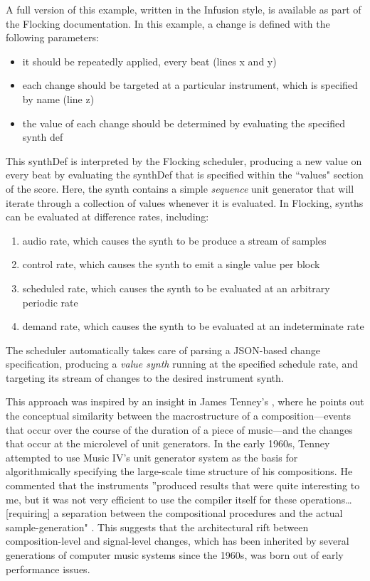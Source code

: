 \documentclass{article}
\begin{document}
A full version of this example, written in the Infusion style, is available as part of the Flocking documentation. In this example, a change is defined with the following parameters:

\begin{itemize}
\item it should be repeatedly applied, every beat (lines x and y)
\item each change should be targeted at a particular instrument, which is specified by name (line z)
\item the value of each change should be determined by evaluating the specified synth def
\end{itemize}

This synthDef is interpreted by the Flocking scheduler, producing a new value on every beat by evaluating the synthDef that is specified within the ``values" section of the score. Here, the synth contains a simple {\it sequence} unit generator that will iterate through a collection of values whenever it is evaluated. In Flocking, synths can be evaluated at difference rates, including:

\begin{enumerate}
\item audio rate, which causes the synth to be produce a stream of samples
\item control rate, which causes the synth to emit a single value per block
\item scheduled rate, which causes the synth to be evaluated at an arbitrary periodic rate
\item demand rate, which causes the synth to be evaluated at an indeterminate rate
\end{enumerate}

The scheduler automatically takes care of parsing a JSON-based change specification, producing a {\it value synth} running at the specified schedule rate, and targeting its stream of changes to the desired instrument synth.

This approach was inspired by an insight in James Tenney's \cite{tenney1969computer}, where he points out the conceptual similarity between the macrostructure of a composition---events that occur over the course of the duration of a piece of music---and the changes that occur at the microlevel of unit generators. In the early 1960s, Tenney attempted to use Music IV's unit generator system as the basis for algorithmically specifying the large-scale time structure of his compositions. He commented that the instruments ''produced results that were quite interesting to me, but it was not very efficient to use the compiler itself for these operations\ldots [requiring] a separation between the compositional procedures and the actual sample-generation" \cite[p.41--42]{tenney1969computer}. This suggests that the architectural rift between composition-level and signal-level changes, which has been inherited by several generations of computer music systems since the 1960s, was born out of early performance issues.
\end{document}
